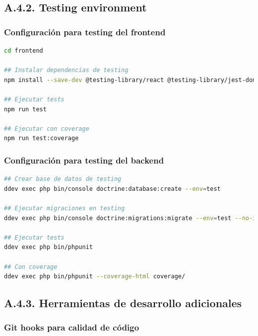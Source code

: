 \documentclass[12pt,a4paper,oneside]{report}
\begin{document}
\subsection{A.4.2. Testing
environment}\label{a.4.2.-testing-environment}

\subsubsection{Configuración para testing del
frontend}\label{configuraciuxf3n-para-testing-del-frontend}

\begin{lstlisting}[language=bash]
cd frontend

## Instalar dependencias de testing
npm install --save-dev @testing-library/react @testing-library/jest-dom vitest

## Ejecutar tests
npm run test

## Ejecutar con coverage
npm run test:coverage
\end{lstlisting}

\subsubsection{Configuración para testing del
backend}\label{configuraciuxf3n-para-testing-del-backend}

\begin{lstlisting}[language=bash]
## Crear base de datos de testing
ddev exec php bin/console doctrine:database:create --env=test

## Ejecutar migraciones en testing
ddev exec php bin/console doctrine:migrations:migrate --env=test --no-interaction

## Ejecutar tests
ddev exec php bin/phpunit

## Con coverage
ddev exec php bin/phpunit --coverage-html coverage/
\end{lstlisting}

\subsection{A.4.3. Herramientas de desarrollo
adicionales}\label{a.4.3.-herramientas-de-desarrollo-adicionales}

\subsubsection{Git hooks para calidad de
código}\label{git-hooks-para-calidad-de-cuxf3digo}
\end{document}
